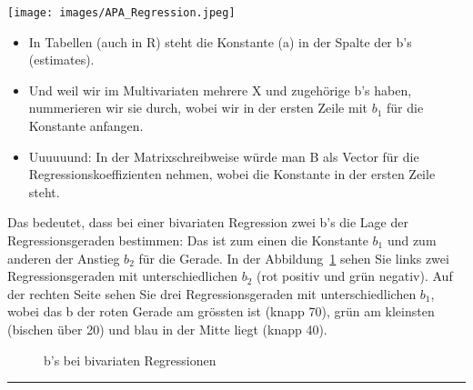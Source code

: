 \documentclass[
  10pt,
  letterpaper,
  a4paper, twoside]{scrreprt}
\providecommand{\tightlist}{%
  \setlength{\itemsep}{0pt}\setlength{\parskip}{0pt}}\usepackage{longtable,booktabs,array}
\begin{document}
\texttt{[image: images/APA\_Regression.jpeg]}

\begin{tcolorbox}[enhanced jigsaw, coltitle=black, opacitybacktitle=0.6, toptitle=1mm, colbacktitle=quarto-callout-note-color!10!white, colback=white, toprule=.15mm, opacityback=0, bottomrule=.15mm, arc=.35mm, colframe=quarto-callout-note-color-frame, leftrule=.75mm, titlerule=0mm, breakable, left=2mm, rightrule=.15mm, title={Warum die Schreibweise ändern?}, bottomtitle=1mm]

\begin{itemize}
\tightlist
\item
  In Tabellen (auch in R) steht die Konstante (a) in der Spalte der b's
  (estimates).
\item
  Und weil wir im Multivariaten mehrere X und zugehörige b's haben,
  nummerieren wir sie durch, wobei wir in der ersten Zeile mit \(b_1\)
  für die Konstante anfangen.
\item
  Uuuuuund: In der Matrixschreibweise würde man B als Vector für die
  Regressionskoeffizienten nehmen, wobei die Konstante in der ersten
  Zeile steht.
\end{itemize}

\end{tcolorbox}

Das bedeutet, dass bei einer bivariaten Regression zwei b's die Lage der
Regressionsgeraden bestimmen: Das ist zum einen die Konstante \(b_1\)
und zum anderen der Anstieg \(b_2\) für die Gerade. In der
Abbildung~\ref{fig-RegressionsGeraden}
sehen Sie links zwei Regressionsgeraden mit unterschiedlichen \(b_2\)
(rot positiv und grün negativ). Auf der rechten Seite sehen Sie drei
Regressionsgeraden mit unterschiedlichen \(b_1\), wobei das b der roten
Gerade am grössten ist (knapp 70), grün am kleinsten (bischen über 20)
und blau in der Mitte liegt (knapp 40).

\begin{figure}


\caption{\label{fig-RegressionsGeraden}b's bei bivariaten Regressionen}

\end{figure}%

\begin{center}\rule{0.5\linewidth}{0.5pt}\end{center}
\end{document}
